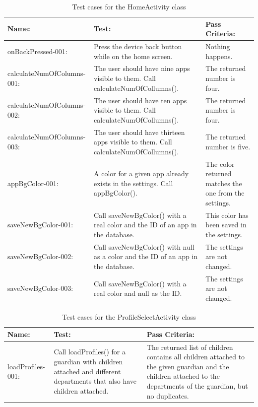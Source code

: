\begin{table}[ht]
\caption{Test cases for the HomeActivity class} %
\centering  %
\begin{tabular}{| p{1.7in} | p{1.7in} | p{1.7in} |}
\hline
Name: & Test: & Pass Criteria: \\ [0.5ex] %
\hline    
onBackPressed-001: & Press the device back button while on the home screen. & Nothing happens. \\ \hline 
calculateNumOfColumns-001: & The user should have nine apps visible to them. Call calculateNumOfCollumns(). & The returned number is four. \\ \hline
calculateNumOfColumns-002: & The user should have ten apps visible to them. Call calculateNumOfCollumns(). & The returned number is four. \\ \hline 
calculateNumOfColumns-003: & The user should have thirteen apps visible to them. Call calculateNumOfCollumns(). & The returned number is five. \\ \hline 
appBgColor-001: & A color for a given app already exists in the settings. Call appBgColor(). & The color returned matches the one from the settings. \\ \hline 
saveNewBgColor-001: & Call saveNewBgColor() with a real color and the ID of an app in the database. & This color has been saved in the settings. \\ \hline 
saveNewBgColor-002: & Call saveNewBgColor() with null as a color and the ID of an app in the database. & The settings are not changed. \\ \hline 
saveNewBgColor-003: & Call saveNewBgColor() with a real color and null as the ID. & The settings are not changed. \\ [1ex] 
\hline %
\end{tabular}
\label{table:homeactivity_tests} %
\end{table}

\begin{table}[ht]
\caption{Test cases for the ProfileSelectActivity class} %
\centering  %
\begin{tabular}{| p{1.7in} | p{1.7in} | p{1.7in} |}
\hline
Name: & Test: & Pass Criteria: \\ [0.5ex] %
\hline                  %
loadProfiles-001: & Call loadProfiles() for a guardian with children attached and different departments that also have children attached. & The returned list of children contains all children attached to the given guardian and the children attached to the departments of the guardian, but no duplicates. \\ [1ex]  
\hline %
\end{tabular}
\label{table:profileselectactivity_tests} %
\end{table}

